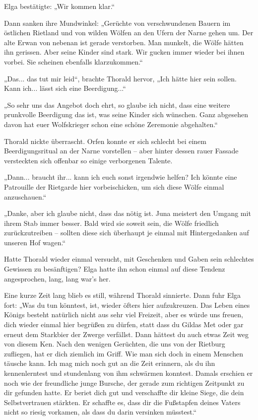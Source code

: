 Elga bestätigte: „Wir kommen klar.“

Dann sanken ihre Mundwinkel: „Gerüchte von verschwundenen Bauern im östlichen Rietland und von wilden Wölfen an den Ufern der Narne gehen um. Der alte Erwan von nebenan ist gerade verstorben. Man munkelt, die Wölfe hätten ihn gerissen. Aber seine Kinder sind stark. Wir gucken immer wieder bei ihnen vorbei. Sie scheinen ebenfalls klarzukommen.“

„Das... das tut mir leid“, brachte Thorald hervor, „Ich hätte hier sein sollen. Kann ich... lässt sich eine Beerdigung...“

„So sehr uns das Angebot doch ehrt, so glaube ich nicht, dass eine weitere prunkvolle Beerdigung das ist, was seine Kinder sich wünschen. Ganz abgesehen davon hat euer Wolfskrieger schon eine schöne Zeremonie abgehalten.“

Thorald nickte überrascht. Orfen konnte er sich schlecht bei einem Beerdigungsritual an der Narne vorstellen – aber hinter dessen rauer Fassade versteckten sich offenbar so einige verborgenen Talente.

„Dann... braucht ihr... kann ich euch sonst irgendwie helfen? Ich könnte eine Patrouille der Rietgarde hier vorbeischicken, um sich diese Wölfe einmal anzuschauen.“

„Danke, aber ich glaube nicht, dass das nötig ist. Juna meistert den Umgang mit ihrem Stab immer besser. Bald wird sie soweit sein, die Wölfe friedlich zurückzutreiben – sollten diese sich überhaupt je einmal mit Hintergedanken auf unseren Hof wagen.“

Hatte Thorald wieder einmal versucht, mit Geschenken und Gaben sein schlechtes Gewissen zu besänftigen? Elga hatte ihn schon einmal auf diese Tendenz angesprochen, lang, lang war’s her.

Eine kurze Zeit lang blieb es still, während Thorald sinnierte. Dann fuhr Elga fort: „Was du tun könntest, ist, wieder öfters hier aufzukreuzen. Das Leben eines Königs besteht natürlich nicht aus sehr viel Freizeit, aber es würde uns freuen, dich wieder einmal hier begrüßen zu dürfen, statt dass du Gildas Met oder gar erneut dem Starkbier der Zwerge verfällst. Dann hättest du auch etwas Zeit weg von diesem Ken. Nach den wenigen Gerüchten, die uns von der Rietburg zufliegen, hat er dich ziemlich im Griff. Wie man sich doch in einem Menschen täusche kann. Ich mag mich noch gut an die Zeit erinnern, als du ihn kennenlerntest und stundenlang von ihm schwärmen konntest. Damals erschien er noch wie der freundliche junge Bursche, der gerade zum richtigen Zeitpunkt zu dir gefunden hatte. Er beriet dich gut und verschaffte dir kleine Siege, die dein Selbstvertrauen stärkten. Er schaffte es, dass dir die Fußstapfen deines Vaters nicht so riesig vorkamen, als dass du darin versinken müsstest.“

